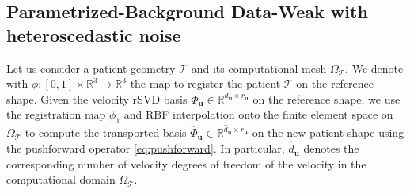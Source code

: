 
\newcommand{\pbdw}[1]{#1_{\rm PBDW}}
\subsection{Parametrized-Background Data-Weak with heteroscedastic noise}
Let us consider a patient geometry $\mathcal T$ and its computational mesh $\Omega_{\mathcal T}$.
%
We denote with $\phi:[0,1]\times\mathbb{R}^3\rightarrow\mathbb{R}^3$
the map to register the patient $\mathcal T$ on the reference shape. %
Given the velocity rSVD basis $\Phi_{\mathbf u}\in\mathbb{R}^{d_{\mathbf u}\times r_{\mathbf u}}$ on the reference shape, we use the registration map $\phi_1$ and RBF interpolation 
onto the finite element space on $\Omega_{\mathcal T}$  to compute the transported basis $\widehat{\Phi}_{\mathbf u}\in\mathbb{R}^{\widehat{d}_{\mathbf u}\times r_{\mathbf u}}$  on the new patient shape using the pushforward operator \eqref{eq:pushforward}. In particular, $\widehat{d}_{\mathbf u}$ denotes the corresponding number of velocity degrees of freedom of the velocity in the
computational domain $\Omega_{\mathcal T}$.

